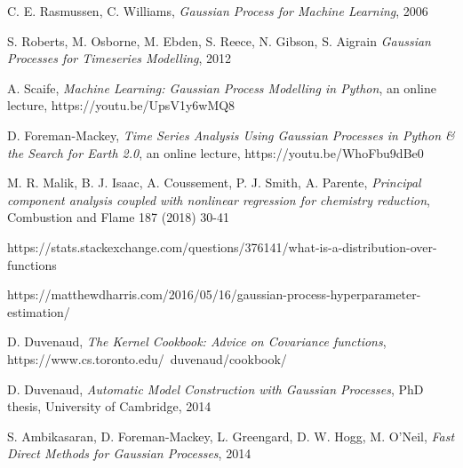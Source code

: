 \documentclass[10pt,twocolumn]{article}
\begin{document}
\thebibliography{}

 C. E. Rasmussen, C. Williams, \textit{Gaussian Process for Machine Learning}, 2006

 S. Roberts, M. Osborne, M. Ebden, S. Reece, N. Gibson, S. Aigrain \textit{Gaussian Processes for Timeseries Modelling}, 2012

 A. Scaife, \textit{Machine Learning: Gaussian Process Modelling in Python}, an online lecture, https://youtu.be/UpsV1y6wMQ8

 D. Foreman-Mackey, \textit{Time Series Analysis Using Gaussian Processes in Python \& the Search for Earth 2.0}, an online lecture, https://youtu.be/WhoFbu9dBe0

 M. R. Malik, B. J. Isaac, A. Coussement, P. J. Smith, A. Parente, \textit{Principal component analysis coupled with nonlinear regression for chemistry reduction}, Combustion and Flame 187 (2018) 30-41

 https://stats.stackexchange.com/questions/376141/what-is-a-distribution-over-functions

\bibitem{} https://matthewdharris.com/2016/05/16/gaussian-process-hyperparameter-estimation/

 D. Duvenaud, \textit{The Kernel Cookbook: Advice on Covariance functions}, https://www.cs.toronto.edu/~duvenaud/cookbook/


 D. Duvenaud, \textit{Automatic Model Construction with Gaussian Processes}, PhD thesis,  University of Cambridge, 2014

 S. Ambikasaran, D. Foreman-Mackey, L. Greengard, D. W. Hogg, M. O'Neil, \textit{Fast Direct Methods for Gaussian Processes}, 2014
\end{document}
